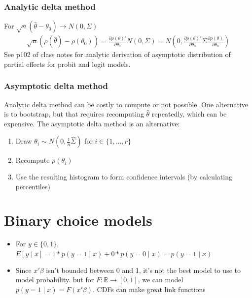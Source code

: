 \documentclass{article}
\begin{document}
\subsubsection{Analytic delta method}
For $\sqrt{n}(\hat{\theta} - \theta_0) \longrightarrow N(0, \Sigma)$
\begin{align*}
  \sqrt{n}(\rho(\hat{\theta}) - \rho(\theta_0)) = \frac{\partial\rho(\theta)'}{\partial \theta_0}N(0, \Sigma) = N\left(0, \frac{\partial\rho(\theta)'}{\partial \theta_0} \Sigma \frac{\partial\rho(\theta)}{\partial \theta_0}\right)
\end{align*}
See p102 of class notes for analytic derivation of asymptotic distribution of partial effects for probit and logit models.

\subsubsection{Asymptotic delta method}
Analytic delta method can be costly to compute or not possible. One alternative is to bootstrap, but that requires recomputing $\hat{\theta}$ repeatedly, which can be expensive. The asymptotic delta method is an alternative:

\begin{enumerate}
  \item Draw $\theta_i \sim N(0, \frac{1}{n}\hat{\Sigma})$ for $i \in \{1, \dots, r\}$
  \item Recompute $\rho(\theta_i)$
  \item Use the resulting histogram to form confidence intervals (by calculating percentiles)
\end{enumerate}




\section{Binary choice models}
\begin{itemize}
  \item For $y \in \{0, 1\}$, $E[y \mid x] = 1 * p(y=1 \mid x) + 0 * p(y=0\mid x) = p(y=1 \mid x)$
  \item Since $x'\beta$ isn't bounded between 0 and 1, it's not the best model to use to model probability. but for $F: \mathbb{R} \rightarrow [0,1]$, we can model $p(y=1\mid x) = F(x'\beta)$. CDFs can make great link functions
\end{itemize}
\end{document}

